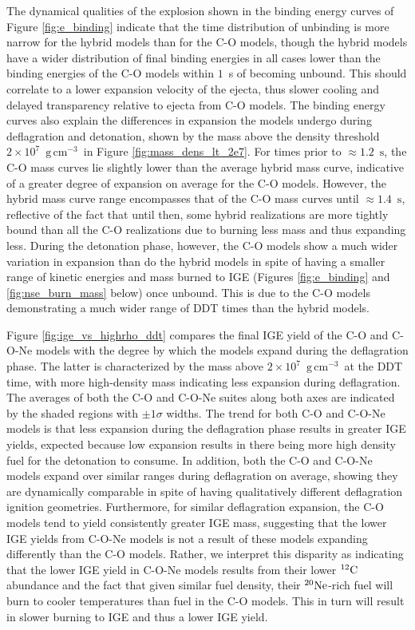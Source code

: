 \documentclass[iop,apj]{emulateapj}
\newcommand{\C}[1]{\ensuremath{{}^{#1}{\rm C}}}
\newcommand{\Ne}[1]{\ensuremath{{}^{#1}{\rm Ne}}}
\newcommand{\unitspace}{\ensuremath{\,}}
\newcommand{\usp}{\unitspace}
\newcommand{\unitstyle}[1]{\ensuremath{\mathrm{#1}}}
\newcommand{\power}[2]{\ensuremath{{#1}^{#2}}}
\newcommand{\centi}{\unitstyle{c}}
\newcommand{\meter}{\unitstyle{m}}
\newcommand{\second}{\unitstyle{s}}
\newcommand{\cm}{\centi\meter}
\newcommand{\gram}{\unitstyle{g}}
\newcommand{\grampercc}{\gram\usp\power{\cm}{-3}} %
\begin{document}
The dynamical qualities of the explosion shown in the binding energy
curves of Figure \ref{fig:e_binding} indicate that the time
distribution of unbinding is more narrow for the hybrid models than
for the C-O models, though the hybrid models have a wider distribution
of final binding energies in all cases lower than the binding energies
of the C-O models within $1$~s of becoming unbound. This should
correlate to a lower expansion velocity of the ejecta, thus slower
cooling and delayed transparency relative to ejecta from C-O models.
The binding energy curves also explain the differences in expansion
the models undergo during deflagration and detonation, shown by the
mass above the density threshold $2 \times 10^7$~\grampercc\ in Figure
\ref{fig:mass_dens_lt_2e7}. For times prior to $\approx 1.2$~\second,
the C-O mass curves lie slightly lower than the average hybrid mass
curve, indicative of a greater degree of expansion on average for the
C-O models. However, the hybrid mass curve range encompasses that of
the C-O mass curves until $\approx 1.4$~\second, reflective of the
fact that until then, some hybrid realizations
are more tightly bound than all the C-O
realizations due to burning less mass and thus expanding less. 
During the detonation phase, however, the
C-O models show a much wider variation in expansion than do the hybrid
models in spite of having a smaller range of kinetic energies and
mass burned to IGE (Figures \ref{fig:e_binding} and
\ref{fig:nse_burn_mass} below) once unbound. This is due to the C-O
models demonstrating a much wider range of DDT times than the hybrid
models.

Figure \ref{fig:ige_vs_highrho_ddt} compares the final IGE yield of
the C-O and C-O-Ne models with the degree by which the models expand
during the deflagration phase. The latter is characterized by the mass
above $2 \times 10^7$~\grampercc\ at the DDT time, with more high-density mass
indicating less expansion during deflagration. The averages of both
the C-O and C-O-Ne suites along both axes are indicated by the shaded
regions with $\pm1\sigma$ widths. The trend for both C-O and C-O-Ne
models is that less expansion during the deflagration phase results in
greater IGE yields, expected because low expansion results in there
being more high density fuel for the detonation to consume. In
addition, both the C-O and C-O-Ne models expand over similar ranges
during deflagration on average, showing they are dynamically comparable in spite of
having qualitatively different deflagration ignition
geometries. Furthermore, for similar deflagration expansion, the C-O
models tend to yield consistently greater IGE mass, suggesting that
the lower IGE yields from C-O-Ne models is not a result of these
models expanding differently than the C-O models. Rather, we interpret
this disparity as indicating that the lower IGE yield in C-O-Ne models
results from their lower \C{12} abundance and the fact that given
similar fuel density, their \Ne{20}-rich fuel will burn to cooler
temperatures than fuel in the C-O models. This in turn will result in
slower burning to IGE and thus a lower IGE yield.
\end{document}

